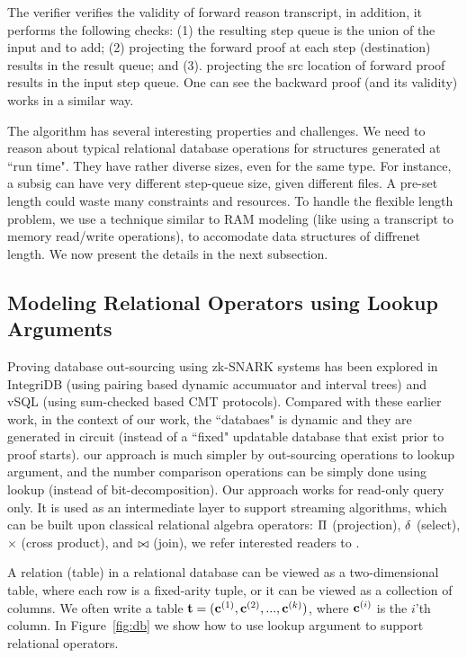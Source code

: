 The verifier verifies the validity of forward reason transcript,
in addition, it performs the following checks: (1)
the resulting step queue is the union of the input and
to add; (2) projecting the forward proof at 
each step (destination) results in the result queue;
and (3).  projecting the src location of forward proof results in
the input step queue.  One can see the backward proof (and its validity) 
works in a similar way.

The algorithm has several interesting properties and challenges.
We need to reason about typical relational database operations
for structures generated at ``run time". They have
rather diverse sizes, even for the same type. For instance,
a subsig can have very different step-queue size, given different files.
A pre-set length could waste many constraints and resources.
To handle the flexible length problem, we use a technique
similar to RAM modeling (like using a transcript to memory read/write
operations), to accomodate data structures of diffrenet length.
We now present the details in the next subsection.

\subsection{Modeling Relational Operators using Lookup Arguments}
Proving database out-sourcing using zk-SNARK systems has been
explored in IntegriDB \cite{IntegriDB} (using pairing based dynamic accumuator
and interval trees) and
vSQL \cite{vSQL} (using sum-checked based CMT protocols).
Compared with these earlier work, in the context of our work, 
the ``databaes" is dynamic and they are generated
in circuit (instead of a ``fixed" updatable database that exist
prior to proof starts). our approach is much simpler by out-sourcing operations
to lookup argument, and the number comparison operations can be simply done
using lookup (instead of bit-decomposition).
Our approach works for read-only query only. It is used as an intermediate
layer to support streaming algorithms, which can be built upon
classical relational algebra operators: $\Pi$ (projection), $\delta$ (select),
$\times$ (cross product), and $\bowtie$ (join), we refer interested
readers to \cite{AHV95}. 

A relation (table) in a relational database can be viewed as a two-dimensional
table, where each row is a fixed-arity tuple, or it can be
viewed as a collection of columns. We often write a table
${{\mathbf {t}}} = ({{\mathbf {c}}}^{(1)}, {{\mathbf {c}}}^{(2)}, ..., {{\mathbf {c}}}^{(k)})$, 
where ${{\mathbf {c}}}^{(i)}$ is the $i$'th column.
In Figure\ \ref{fig:db} we show how to use lookup argument to support
relational operators.

